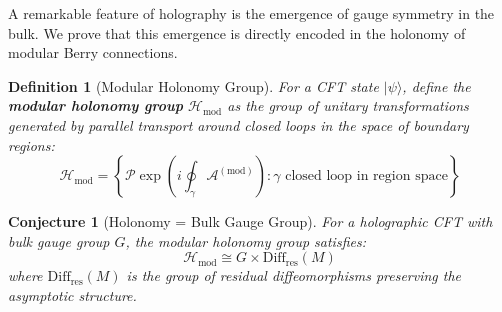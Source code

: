 \documentclass[12pt,a4paper]{article}
\newtheorem{conjecture}[theorem]{Conjecture}
\newtheorem{definition}[theorem]{Definition}
\begin{document}
A remarkable feature of holography is the emergence of gauge symmetry in the bulk. We prove that this emergence is directly encoded in the holonomy of modular Berry connections.

\begin{definition}[Modular Holonomy Group]
For a CFT state $|\psi\rangle$, define the \textbf{modular holonomy group} $\mathcal{H}_{\text{mod}}$ as the group of unitary transformations generated by parallel transport around closed loops in the space of boundary regions:
\begin{equation}
\mathcal{H}_{\text{mod}} = \left\{ \mathcal{P} \exp\left( i \oint_\gamma \mathcal{A}^{(\text{mod})} \right) : \gamma \text{ closed loop in region space} \right\}
\end{equation}
\end{definition}

\begin{conjecture}[Holonomy = Bulk Gauge Group]
For a holographic CFT with bulk gauge group $G$, the modular holonomy group satisfies:
\begin{equation}
\mathcal{H}_{\text{mod}} \cong G \times \text{Diff}_{\text{res}}(M)
\end{equation}
where $\text{Diff}_{\text{res}}(M)$ is the group of residual diffeomorphisms preserving the asymptotic structure.
\end{conjecture}
\end{document}
